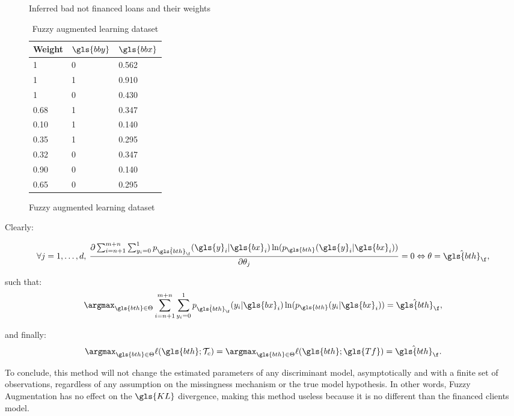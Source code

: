 \begin{table}
{\begin{multicols}{4}
\begin{subfigure}[t]{0.22\textwidth}
\caption{Inferred bad not financed loans and their weights}
\label{fuzzy:sfig3}
\end{subfigure}

\columnbreak

\begin{subfigure}[t]{0.22\textwidth}
\begin{center}
\begin{adjustbox}{max width=0.95\textwidth}
\begin{tabular}{l l l}
\toprule
\textbf{Weight} & \textbf{${\gls{bby}}$} & \textbf{${\gls{bbx}}$}\\
\midrule
1 & 0 & 0.562 \\
1 & 1 & 0.910 \\
1 & 0 & 0.430 \\
0.68 & 1 & 0.347 \\
0.10 & 1 & 0.140 \\
0.35 & 1 & 0.295 \\
0.32 & 0 & 0.347 \\
0.90 & 0 & 0.140 \\
0.65 & 0 & 0.295 \\
\bottomrule
\end{tabular}
\end{adjustbox}
\end{center}
\caption{Fuzzy augmented learning dataset}
\label{fuzzy:sfig4}
\end{subfigure}

\end{multicols}
}
\end{table}

Clearly:

\[ \forall j = 1, \ldots, d, \: \frac{\partial \sum_{i=n+1}^{m+n} \sum_{y_i = 0}^{1} p_{\hat{\gls{bth}}_\f}(\gls{y}_i| \gls{bx}_i)\ln (p_{\gls{bth}}(\gls{y}_i| \gls{bx}_i))}{\partial \theta_j} = 0 \Leftrightarrow \theta = \hat{\gls{bth}}_{\f}, \]

such that:
\[\argmax_{\gls{bth} \in \Theta}  \sum_{i=n+1}^{m+n} \sum_{y_i = 0}^{1} p_{\hat{\gls{bth}}_{\f}}(y_i| \gls{bx}_i)\ln (p_{\gls{bth}}(y_i| \gls{bx}_i)) = \hat{\gls{bth}}_{\f},\]

and finally:
\[\argmax_{\gls{bth} \in \Theta} \ell(\gls{bth};\mathcal{T}_{c}) = \argmax_{\gls{bth} \in \Theta} \ell(\gls{bth};\gls{Tf}) = \hat{\gls{bth}}_{\f}. \]

 To conclude, this method will not change the estimated parameters of any discriminant model, asymptotically and with a finite set of observations, regardless of any assumption on the missingness mechanism or the true model hypothesis. In other words, Fuzzy Augmentation has no effect on the $\gls{KL}$ divergence, making this method useless because it is no different than the financed clients model.


